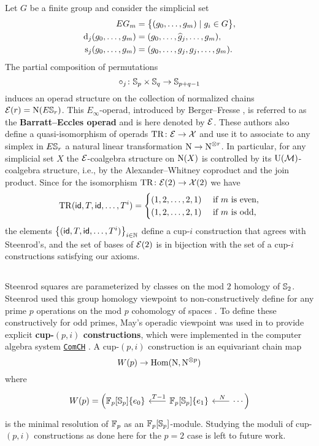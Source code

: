 Let $G$ be a finite group and consider the simplicial set
\[
\begin{split}
EG_m &= \big\{ (g_0, \dots, g_m) \mid g_i \in G \big\}, \\
\operatorname{d}_j(g_0, \dots, g_m) &= (g_0, \dots, \widehat g_j, \dots, g_m), \\
\operatorname{s}_j(g_0, \dots, g_m) &= (g_0, \dots, g_j, g_j, \dots, g_m).
\end{split}
\]
The partial composition of permutations
\[
\circ_j \colon \mathbb{S}_p \times \mathbb{S}_q \to \mathbb{S}_{p+q-1}
\]
induces an operad structure on the collection of normalized chains $\mathcal{E}(r) = \operatorname{N}(E \mathbb{S}_r)$.
This $E_\infty$-operad, introduced by Berger--Fresse \cite{berger2004combinatorial}, is referred to as the \textbf{Barratt--Eccles operad} and is here denoted by $\mathcal{E}$.
These authors also define a quasi-isomorphism of operads $\mathrm{TR} \colon \mathcal{E} \to \mathcal{X}$ and use it to associate to any simplex in $E \mathbb{S}_r$ a natural linear transformation $\operatorname{N} \to \operatorname{N}^{\otimes r}$.
In particular, for any simplicial set $X$ the $\mathcal{E}$-coalgebra structure on $\operatorname{N}(X)$ is controlled by its ${\operatorname{U}(\mathcal{M})}$-coalgebra structure, i.e., by the Alexander--Whitney coproduct and the join product.
Since for the isomorphism $\mathrm{TR} \colon \mathcal{E}(2) \to \mathcal{X}(2)$ we have
\[
\mathrm{TR}(\mathsf{id}, T, \mathsf{id}, \dots, T^i) =
\begin{cases}
(1,2,\dots,2,1) & \text{ if } m \text{ is even}, \\
(1,2,\dots,2,1) & \text{ if } m \text{ is odd},
\end{cases}
\]
the elements $\big\{ (\mathsf{id}, T, \mathsf{id}, \dots, T^i) \big\}_{i \in \mathbb{N}}$ define a \mbox{cup-$i$} construction that agrees with Steenrod's, and the set of bases of $\mathcal{E}(2)$ is in bijection with the set of a \mbox{cup-$i$} constructions satisfying our axioms.

\subsection{}

Steenrod squares are parameterized by classes on the mod $2$ homology of $\mathbb{S}_2$.
Steenrod used this group homology viewpoint to non-constructively define for any prime $p$ operations on the mod $p$ cohomology of spaces \cite{steenrod1952reduced, steenrod1953cyclic}.
To define these constructively for odd primes, May's operadic viewpoint \cite{may1970general} was used in \cite{medina2021may_st} to provide explicit \textbf{cup-$(p,i)$ constructions}, which were implemented in the computer algebra system \href{https://github.com/ammedmar/comch}{\texttt{ComCH}} \cite{medina2021comch}.
A cup-$(p,i)$ construction is an equivariant chain map
\[
W(p) \to \mathrm{Hom}(\operatorname{N}, \operatorname{N}^{\otimes p})
\]
where
\[
\begin{tikzcd}[column sep = 20pt]
	W(p) = \Big(
	\Fp[\Sym_p]\{e_0\} &
	\Fp[\Sym_p]\{e_1\} \arrow[l, "\ T-1"'] &
	\arrow[l, "\ N"'] \cdots \Big)
\end{tikzcd}
\]
is the minimal resolution of ${\mathbb{F}_p}$ as an ${\mathbb{F}_p}[\mathbb{S}_p]$-module.
Studying the moduli of cup-$(p,i)$ constructions as done here for the $p = 2$ case is left to future work.
